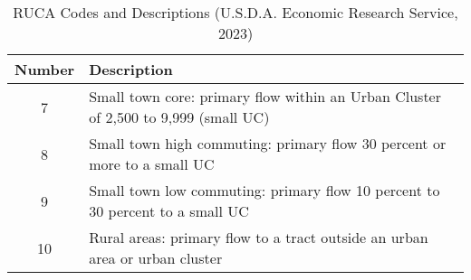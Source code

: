 \begin{table}[htbp]
    \centering
    \caption[RUCA Codes and Descriptions]{RUCA Codes and Descriptions (U.S.D.A. Economic Research Service, 2023)}
    \label{tab:ruca_descriptions}
    \begin{tabular}{|c|p{10cm}|}
        \hline
        \textbf{Number} & \textbf{Description} \\
        \hline
        7 & Small town core: primary flow within an Urban Cluster of 2,500 to 9,999 (small UC) \\
        \hline
        8 & Small town high commuting: primary flow 30 percent or more to a small UC \\
        \hline
        9 & Small town low commuting: primary flow 10 percent to 30 percent to a small UC \\
        \hline
        10 & Rural areas: primary flow to a tract outside an urban area or urban cluster \\
        \hline
    \end{tabular}
\end{table}
